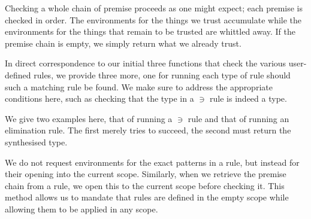 Checking a whole chain of premise proceeds as one might expect; each premise is
checked in order. The environments for the things we trust accumulate while the
environments for the things that remain to be trusted are whittled away. If the
premise chain is empty, we simply return what we already trust.

In direct correspondence to our initial three functions that check the
various user-defined rules, we provide three more, one for running each
type of rule should such a matching rule be found. We make sure to address
the appropriate conditions here, such as checking that the type in a $∋$
rule is indeed a type.

We give two examples here, that of running a $∋$ rule and that of running
an elimination rule. The first merely tries to succeed, the second must
return the synthesised type.

We do not request environments for the exact patterns in a rule, but instead
for their opening into the current scope. Similarly, when we retrieve the
premise chain from a rule, we open this to the current scope before
checking it. This method allows us to mandate that rules are defined in the
empty scope while allowing them to be applied in any scope.


